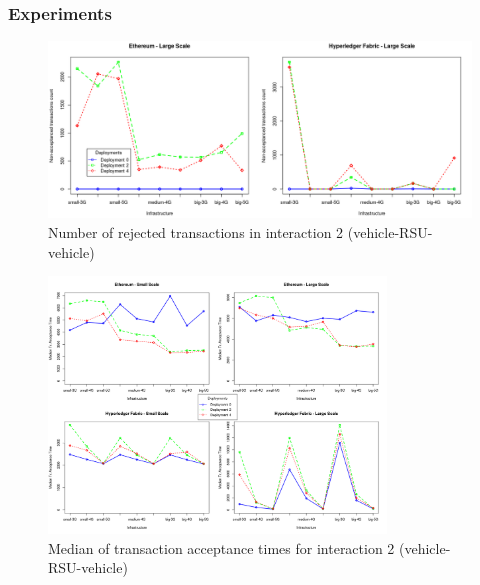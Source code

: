 \documentclass{beamer}
\begin{document}
	\begin{frame}
		\frametitle{Experiments}
		
		\begin{figure}
			\centering
			\includegraphics[width=\textwidth]{figures/interaction2_rejected_tx.png}
			\vspace{-0.5cm}
			\caption{Number of rejected transactions in interaction 2 (vehicle-\gls{RSU}-vehicle)}
			\label{fig:experiments0}
		\end{figure}
		
	\end{frame}


	\begin{frame}
		
		\begin{figure}
			\centering
			\includegraphics[width=0.8\textwidth]{figures/interaction2_median_accept_time.png}
			\vspace{-0.5cm}
			\caption{Median of transaction acceptance times for interaction 2 (vehicle-\gls{RSU}-vehicle)}
			\label{fig:experiments}
		\end{figure}
		
	\end{frame}
\end{document}

